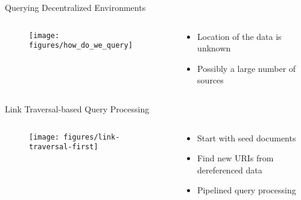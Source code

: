 \begin{frame}{Querying Decentralized Environments}
    \begin{columns}[T] %
        \begin{column}{.48\textwidth}

       \begin{figure}
            \centering
            \texttt{[image: figures/how\_do\_we\_query]}
        \end{figure}

        \end{column}%
        \hfill%
        \begin{column}{.48\textwidth}
            \bigskip
            \begin{itemize}
                \item Location of the data is unknown
                \item Possibly a large number of sources
            \end{itemize}
        \end{column}%
    \end{columns}
\end{frame}

\begin{frame}{Link Traversal-based Query Processing}
    \begin{columns}[T] %
        \begin{column}{.48\textwidth}

       \begin{figure}
            \centering
            \texttt{[image: figures/link-traversal-first]}
        \end{figure}

        \end{column}%
        \hfill%
        \begin{column}{.48\textwidth}
            \bigskip
            \begin{itemize}
                \item Start with seed documents
                \item Find new URIs from dereferenced data
                \item Pipelined query processing
            \end{itemize}
        \end{column}%
    \end{columns}
\end{frame}


